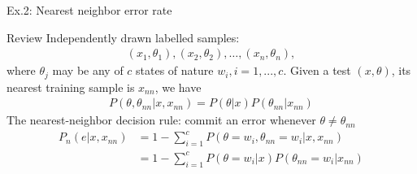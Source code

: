 \documentclass[compress,blue]{beamer}
\begin{document}
{ %
    \begin{frame}[plain]
     \end{frame}
}

\begin{frame}{Ex.2: Nearest neighbor error rate}
	\begin{block}{Review}
		\small
		Independently drawn labelled samples:
		\begin{align}
			(x_1, \theta_1), (x_2, \theta_2), \hdots, (x_n, \theta_n),
		\end{align}
		where $\theta_j$ may be any of $c$ states of nature $w_i, i = 1, ..., c$.
		Given a test $(x, \theta)$, its nearest training sample is $x_{nn}$, we have
		\begin{align}
			P(\theta, \theta_{nn} | x, x_{nn}) = P(\theta | x) P(\theta_{nn} | x_{nn})
		\end{align}
		The nearest-neighbor decision rule: commit an error whenever $\theta \neq \theta_{nn}$
		\begin{align}
			P_n(e | x, x_{nn}) &= 1 - \sum_{i=1}^c P(\theta = w_i, \theta_{nn} = w_i | x, x_{nn}) \\
			&=1 - \sum_{i=1}^c P(\theta = w_i|x)P(\theta_{nn} = w_i | x_{nn})
		\end{align}
		\normalsize
	\end{block}
\end{frame}
\end{document}

